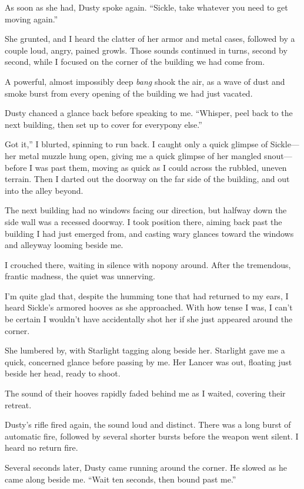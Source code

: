As soon as she had, Dusty spoke again. “Sickle, take whatever you need to get moving again.”

She grunted, and I heard the clatter of her armor and metal cases, followed by a couple loud, angry, pained growls. Those sounds continued in turns, second by second, while I focused on the corner of the building we had come from.

A powerful, almost impossibly deep \textit{bang} shook the air, as a wave of dust and smoke burst from every opening of the building we had just vacated.

Dusty chanced a glance back before speaking to me. “Whisper, peel back to the next building, then set up to cover for everypony else.”

\leavevmode{}Got it,” I blurted, spinning to run back. I caught only a quick glimpse of Sickle—her metal muzzle hung open, giving me a quick glimpse of her mangled snout—before I was past them, moving as quick as I could across the rubbled, uneven terrain. Then I darted out the doorway on the far side of the building, and out into the alley beyond.

The next building had no windows facing our direction, but halfway down the side wall was a recessed doorway. I took position there, aiming back past the building I had just emerged from, and casting wary glances toward the windows and alleyway looming beside me.

I crouched there, waiting in silence with nopony around. After the tremendous, frantic madness, the quiet was unnerving.

I’m quite glad that, despite the humming tone that had returned to my ears, I heard Sickle’s armored hooves as she approached. With how tense I was, I can’t be certain I wouldn’t have accidentally shot her if she just appeared around the corner.

She lumbered by, with Starlight tagging along beside her. Starlight gave me a quick, concerned glance before passing by me. Her Lancer was out, floating just beside her head, ready to shoot.

The sound of their hooves rapidly faded behind me as I waited, covering their retreat.

Dusty’s rifle fired again, the sound loud and distinct. There was a long burst of automatic fire, followed by several shorter bursts before the weapon went silent. I heard no return fire.

Several seconds later, Dusty came running around the corner. He slowed as he came along beside me. “Wait ten seconds, then bound past me.”

